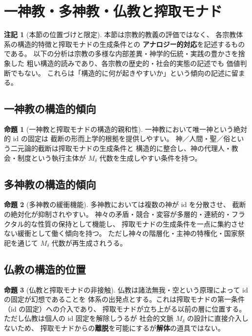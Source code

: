 \documentclass[11pt,a4paper]{ltjsarticle}
\newcommand{\Mdelta}{M_\delta}
\theoremstyle{definition}
\newtheorem{proposition}{命題}[section]
\newtheorem{remark}{注記}[section]
\begin{document}
\section{一神教・多神教・仏教と搾取モナド}

\begin{remark}[本節の位置づけと限定]
本節は宗教的教義の評価ではなく、
各宗教体系の構造的特徴と搾取モナドの生成条件との
\textbf{アナロジー的対応}を記述するものである。
以下の分析は宗教の多様な内部差異・神学的伝統・実践の豊かさを捨象した
粗い構造的読みであり、各宗教の歴史的・社会的実態の記述でも
価値判断でもない。
これらは「構造的に何が起きやすいか」という傾向の記述に留まる。
\end{remark}

\subsection{一神教の構造的傾向}

\begin{proposition}[一神教と搾取モナドの構造的親和性]
一神教において唯一神という絶対的 $\mathrm{id}$ の固定は
截断の形而上学的根拠を提供しやすい。
神／人間・聖／俗という二元論的截断は搾取モナドの生成条件と
構造的に整合し、神の代理人・教会・制度という執行主体が
$\Mdelta$ 代数を生成しやすい条件を持つ。
\end{proposition}

\subsection{多神教の構造的傾向}

\begin{proposition}[多神教の緩衝機能]
多神教においては複数の神が $\mathrm{id}$ を分散させ、
截断の絶対化が抑制されやすい。
神々の矛盾・競合・変容が多層的・連続的・フラクタル的な性質の保持として機能し、
搾取モナドの生成条件を一点に集約させない緩衝として働く傾向を持つ。
ただし神々の階層化・主神の特権化・国家祭祀を通じて
$\Mdelta$ 代数が再生成されうる。
\end{proposition}

\subsection{仏教の構造的位置}

\begin{proposition}[仏教と搾取モナドの非接触]
仏教は諸法無我・空という原理によって $\mathrm{id}$ の固定が幻想であることを
体系の出発点とする。これは搾取モナドの第一条件（$\mathrm{id}$ の固定）への介入であり、
搾取モナドが立ち上がる以前の層に位置する。
ただし仏教は個人の $\mathrm{id}$ 固定を解除しうるが
社会的文脈 $\Mdelta$ の設計に直接介入しないため、
搾取モナドからの\textbf{離脱}を可能にするが\textbf{解体}の道具ではない。
\end{proposition}
\end{document}
